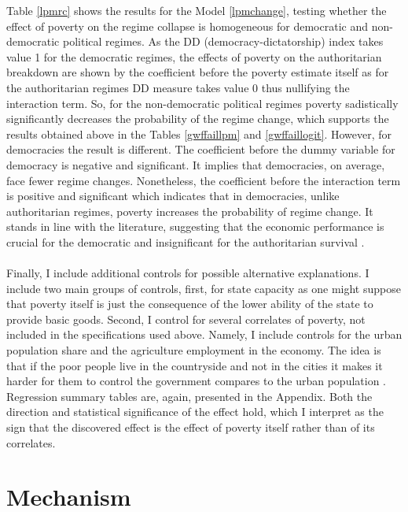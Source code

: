 \documentclass[a4paper, 12pt]{article}
\begin{document}
    \noindent Table \ref{lpmrc} shows the results for the Model \eqref{lpmchange}, testing whether the effect of poverty on the regime collapse is homogeneous for democratic and non-democratic political regimes. As the DD (democracy-dictatorship) index takes value 1 for the democratic regimes, the effects of poverty on the authoritarian breakdown are shown by the coefficient before the poverty estimate itself as for the authoritarian regimes DD measure takes value 0 thus nullifying the interaction term. So, for the non-democratic political regimes poverty sadistically significantly decreases the probability of the regime change, which supports the results obtained above in the Tables \ref{gwffaillpm} and \ref{gwffaillogit}. However, for democracies the result is different. The coefficient before the dummy variable for democracy is negative and significant. It implies that democracies, on average, face fewer regime changes. Nonetheless, the coefficient before the interaction term is positive and significant which indicates that in democracies, unlike authoritarian regimes, poverty increases the probability of regime change. It stands in line with the literature, suggesting that the economic performance is crucial for the democratic and insignificant for the authoritarian survival \parencite{hazard_rate}.
    \\\\
    \noindent Finally, I include additional controls for possible alternative explanations. I include two main groups of controls, first, for state capacity as one might suppose that poverty itself is just the consequence of the lower ability of the state to provide basic goods. Second, I control for several correlates of poverty, not included in the specifications used above. Namely, I include controls for the urban population share and the agriculture employment in the economy. The idea is that if the poor people live in the countryside and not in the cities it makes it harder for them to control the government compares to the urban population \parencite{campante1}. Regression summary tables are, again, presented in the Appendix. Both the direction and statistical significance of the effect hold, which I interpret as the sign that the discovered effect is the effect of poverty itself rather than of its correlates.   

    \section{Mechanism}
    
\end{document}
